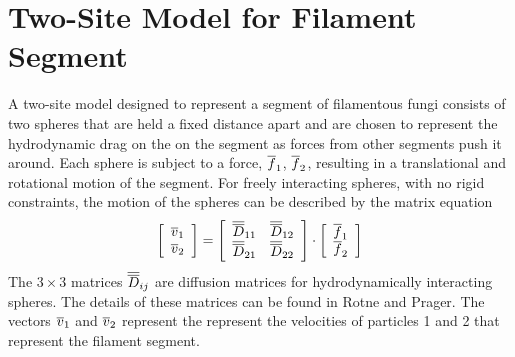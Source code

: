 \documentclass[12pt]{article}
\begin{document}

\section{Two-Site Model for Filament Segment}
A two-site model designed to represent a segment of filamentous fungi consists
of two spheres that are held a fixed distance apart and are chosen to represent
the hydrodynamic drag on the on the segment as forces from other segments push
it around. Each sphere is subject to a force, $\overline{f}_1$, $\overline{f}_2$, resulting in
a translational and rotational motion of the segment. For freely interacting
spheres, with no rigid constraints, the motion of the spheres can be described
by the matrix equation
\[
\left[\begin{array}{c}\overline{v}_1 \\ \overline{v}_2 \end{array}\right] =
\left[\begin{array}{cc} \overline{\overline{D}}_{11} & \overline{\overline{D}}_{12} \\
\overline{\overline{D}}_{21} & \overline{\overline{D}}_{22} \end{array}\right]
\cdot\left[\begin{array}{c} \overline{f}_1 \\ \overline{f}_2 \end{array}\right]
\]
The $3\times 3$ matrices $\overline{\overline{D}}_{ij}$ are diffusion matrices for hydrodynamically
interacting spheres. The details of these matrices can be found in Rotne and
Prager\cite{RP}. The vectors $\overline{v}_1$ and $\overline{v}_2$ represent the represent the
velocities of particles 1 and 2 that represent the filament segment.
\end{document}
